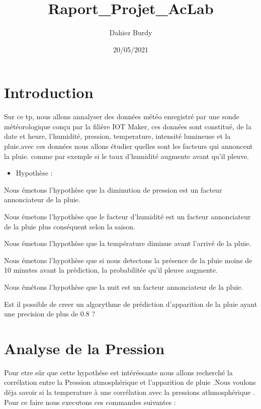 \documentclass[
]{article}
\title{Raport\_Projet\_AcLab}
\author{Dahiez Burdy}
\date{20/05/2021}
\providecommand{\tightlist}{%
  \setlength{\itemsep}{0pt}\setlength{\parskip}{0pt}}
\begin{document}
\maketitle

\hypertarget{introduction}{%
\section{Introduction}\label{introduction}}

Sur ce tp, nous allons annalyser des données météo enregistré par une
sonde météorologique conçu par la filière IOT Maker, ces données sont
constitué, de la date et heure, l'humidité, pression, temperature,
intensité lumineuse et la pluie.avec ces données nous allons étudier
quelles sont les facteurs qui annoncent la pluie. comme par exemple si
le taux d'humidité augmente avant qu'il pleuve.

\begin{itemize}
\tightlist
\item
  Hypothèse :
\end{itemize}

Nous émetons l'hypothèse que la diminution de pression est un facteur
annonciateur de la pluie.

Nous émetons l'hypothèse que le facteur d'humidité est un facteur
annonciateur de la pluie plus conséquent selon la saison.

Nous émetons l'hypothèse que la température diminue avant l'arrivé de la
pluie.

Nous émetons l'hypothèse que si nous detectons la présence de la pluie
moins de 10 minutes avant la prédiction, la probabilitée qu'il pleuve
augmente.

Nous émétons l'hypothèse que la nuit est un facteur annonciateur de la
pluie.

Est il possible de creer un algorythme de prédiction d'apparition de la
pluie ayant une precision de plus de 0.8 ?

\hypertarget{analyse-de-la-pression}{%
\section{Analyse de la Pression}\label{analyse-de-la-pression}}

Pour etre sûr que cette hypothése est intéréssante nous allons recherché
la corrélation entre la Pression atmosphérique et l'apparition de pluie
.Nous voulons déja savoir si la temperature à une corrélation avec la
pressions athmosphérique . Pour ce faire nous executons ces commandes
suivantes :
\end{document}
